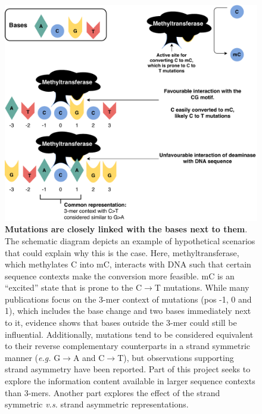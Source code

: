 \begin{figure}[h!]
    \centering
    \includegraphics[scale=0.78]{graphics/motif_demo.pdf}
    \caption{\textbf{Mutations are closely linked with the bases next to them}. The schematic diagram depicts an example of hypothetical scenarios that could explain why this is the case. Here, methyltransferase, which methylates C into mC, interacts with DNA such that certain sequence contexts make the conversion more feasible. mC is an ``excited'' state that is prone to the C$\rightarrow$T mutations. While many publications focus on the 3-mer context of mutations (pos -1, 0 and 1), which includes the base change and two bases immediately next to it, evidence shows that bases outside the 3-mer could still be influential. Additionally, mutations tend to be considered equivalent to their reverse complementary counterparts in a strand symmetric manner (\textit{e.g.} G$\rightarrow$A and C$\rightarrow$T), but observations supporting strand asymmetry have been reported. Part of this project seeks to explore the information content available in larger sequence contexts than 3-mers. Another part explores the effect of the strand symmetric \textit{v.s.} strand asymmetric representations.}
    \label{fig:motif_demo}
\end{figure}
